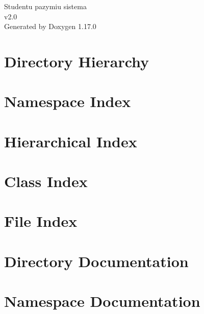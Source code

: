 \documentclass[twoside]{book}
\newcommand{\+}{\discretionary{\mbox{\scriptsize$\hookleftarrow$}}{}{}}
\newcommand{\clearemptydoublepage}{%
    \newpage{\pagestyle{empty}\cleardoublepage}%
  }
\begin{document}
  \raggedbottom
    \hypersetup{pageanchor=false,
                bookmarksnumbered=true,
                pdfencoding=unicode
               }
  \begin{titlepage}
  \vspace*{7cm}
  \begin{center}%
  {\Large Studentu pazymiu sistema}\\
  [1ex]\large v2.\+0 \\
  \vspace*{1cm}
  {\large Generated by Doxygen 1.17.0}\\
  \end{center}
  \end{titlepage}
  \clearemptydoublepage
  \tableofcontents
  \clearemptydoublepage
  \hypersetup{pageanchor=true}
\chapter{Directory Hierarchy}

\chapter{Namespace Index}

\chapter{Hierarchical Index}

\chapter{Class Index}

\chapter{File Index}

\chapter{Directory Documentation}



\chapter{Namespace Documentation}









\end{document}
